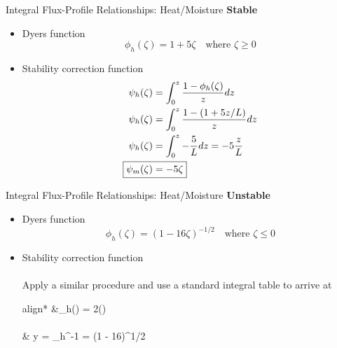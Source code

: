 \begin{frame}{Integral Flux-Profile Relationships: Heat/Moisture}
\textbf{Stable}
\begin{itemize}
	\item Dyers function
	$$\phi_h(\zeta) = 1 + 5\zeta \quad \text{where } \zeta \geq 0$$
	\item Stability correction function
	\begin{align*}
		\psi_h(\zeta) &= \int^z_0 \frac{1-\phi_h(\zeta)}{z} dz\\
		\psi_h(\zeta) &= \int^z_0 \frac{1-(1+5z/L)}{z} dz\\
		\psi_h(\zeta) &= \int^z_0 -\frac{5}{L} dz = -5\frac{z}{L}\\
		\Aboxed{\psi_m(\zeta) &= -5\zeta}
	\end{align*}
\end{itemize}
\end{frame}
\begin{frame}{Integral Flux-Profile Relationships: Heat/Moisture}
\textbf{Unstable}
\begin{itemize}
	\item Dyers function
	$$\phi_h(\zeta) = (1 - 16\zeta)^{-1/2}  \quad \text{where } \zeta \leq 0$$
	\item Stability correction function
	~\\~\\Apply a similar procedure and use a standard integral table to arrive at
	\begin{empheq}[box=\widefbox]{align*}
		&\psi_h(\zeta) = 2\ln\left(\right)\\\\
		& y = \phi_h^{-1} = (1 - 16\zeta)^{1/2}
	\end{empheq}
\end{itemize}
\end{frame}
